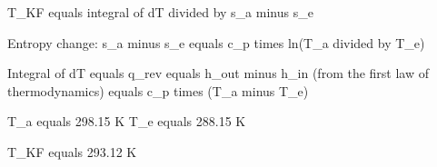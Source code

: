 T_KF equals integral of dT divided by s_a minus s_e  

Entropy change: s_a minus s_e equals c_p times ln(T_a divided by T_e)  

Integral of dT equals q_rev equals h_out minus h_in (from the first law of thermodynamics)  
equals c_p times (T_a minus T_e)  

T_a equals 298.15 K  
T_e equals 288.15 K  

T_KF equals 293.12 K